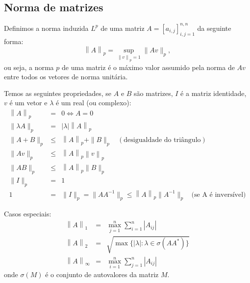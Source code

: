 \subsection{Norma de matrizes}

Definimos a norma induzida $L^p$ de uma matriz $A = [a_{i,j}]_{i,j=1}^{n,n}$ da seguinte forma:
\begin{equation*}
  \left\|A\right\|_p = \sup_{\left\|v\right\|_p=1} \|Av\|_p,
\end{equation*}
ou seja, a norma $p$ de uma matriz é o máximo valor assumido pela norma de $Av$ entre todos os vetores de norma unitária.

Temos as seguintes propriedades, se $A$ e $B$ são matrizes, $I$ é a matriz identidade, $v$ é um vetor e $\lambda$ é um real (ou complexo):
\begin{eqnarray*}
\left\|A\right\|_p&=&0 \Longleftrightarrow A=0\\
\|\lambda A\|_p&=&|\lambda| \left\|A\right\|_p\\
\|A+B\|_p &\leq & \left\|A\right\|_p + \|B\|_p~~~~ (\text{desigualdade do triângulo})\\
\|Av\|_p &\leq& \left\|A\right\|_p\left\|v\right\|_p\\
\|AB\|_p &\leq& \left\|A\right\|_p\|B\|_p\\
\|I\|_p&=&1\\
1&=&\|I\|_p=\|AA^{-1}\|_p\leq \left\|A\right\|_p\|A^{-1}\|_p~~~~ \text{(se A é inversível)}
\end{eqnarray*}

Casos especiais:
\begin{eqnarray*}
\left\|A\right\|_1&=& \max_{j=1}^n\sum_{i=1}^n \left|A_{ij}\right|\\
\left\|A\right\|_2&=& \sqrt{\max\{|\lambda|: \lambda \in \sigma(AA^*)\}}\\
\left\|A\right\|_\infty&=& \max_{i=1}^n\sum_{j=1}^n \left|A_{ij}\right|
\end{eqnarray*}
onde $\sigma(M)$ é o conjunto de autovalores da matriz $M$.


